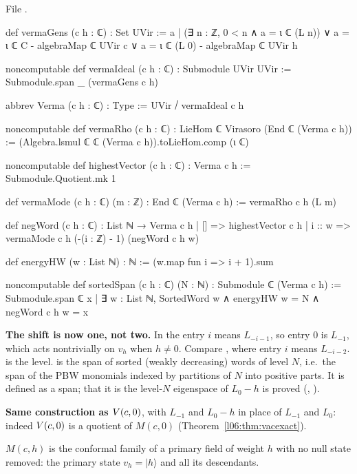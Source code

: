 File .
\begin{leancode}
def vermaGens (c h : ℂ) : Set UVir :=
  {a | (∃ n : ℤ, 0 < n ∧ a = ι ℂ (L n))
      ∨ a = ι ℂ C - algebraMap ℂ UVir c
      ∨ a = ι ℂ (L 0) - algebraMap ℂ UVir h}

noncomputable def vermaIdeal (c h : ℂ) : Submodule UVir UVir :=
  Submodule.span _ (vermaGens c h)

abbrev Verma (c h : ℂ) : Type := UVir ⧸ vermaIdeal c h

noncomputable def vermaRho (c h : ℂ) : LieHom ℂ Virasoro (End ℂ (Verma c h)) :=
  (Algebra.lsmul ℂ ℂ (Verma c h)).toLieHom.comp (ι ℂ)

noncomputable def highestVector (c h : ℂ) : Verma c h :=
  Submodule.Quotient.mk 1

def vermaMode (c h : ℂ) (m : ℤ) : End ℂ (Verma c h) :=
  vermaRho c h (L m)

def negWord (c h : ℂ) : List ℕ → Verma c h
  | [] => highestVector c h
  | i :: w => vermaMode c h (-(i : ℤ) - 1) (negWord c h w)

def energyHW (w : List ℕ) : ℕ := (w.map fun i => i + 1).sum

noncomputable def sortedSpan (c h : ℂ) (N : ℕ) : Submodule ℂ (Verma c h) :=
  Submodule.span ℂ {x | ∃ w : List ℕ,
    SortedWord w ∧ energyHW w = N ∧ negWord c h w = x}
\end{leancode}

\begin{dictionary}
\textbf{The shift is now one, not two.} In  the entry $i$ means $L_{-i-1}$, so entry
$0$ is $L_{-1}$, which acts nontrivially on $v_h$ when $h\ne0$. Compare , where entry $i$
means $L_{-i-2}$.  is the level.  is the span of sorted (weakly
decreasing) words of level $N$, i.e.\ the span of the PBW monomials indexed by partitions of $N$ into
positive parts. It is defined as a span; that it is the level-$N$ eigenspace of $L_0-h$ is proved
(\allowbreak{}\allowbreak{}\allowbreak{}\allowbreak{}, ).

\textbf{Same construction as $V(c,0)$}, with $L_{-1}$ and $L_0-h$ in place of $L_{-1}$ and $L_0$: indeed
$V(c,0)$ is a quotient of $M(c,0)$ (Theorem~\ref{l06:thm:vacexact}).
\end{dictionary}

\begin{physics}
$M(c,h)$ is the conformal family of a primary field of weight $h$ with no null state removed:
the primary state $v_h = |h\rangle$ and all its descendants.
\end{physics}

